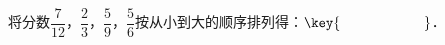 将分数$\dfrac {7}{12}$，$\dfrac {2}{3}$，$\dfrac {5}{9}$，$\dfrac {5}{6}$按从小到大的顺序排列得：$\key{\qquad\qquad\qquad}$．